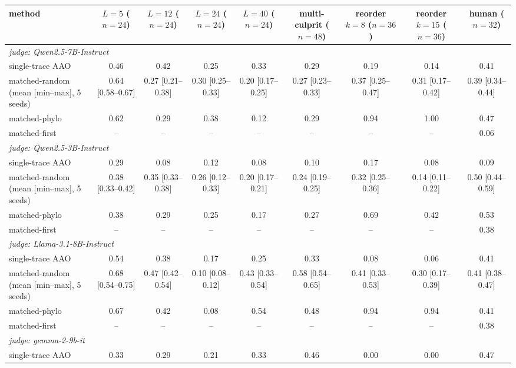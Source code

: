\begin{table}[t]
\centering\small
\begin{tabular}{lcccccccc}
\toprule
method & $L{=}5$ ($n{=}24$) & $L{=}12$ ($n{=}24$) & $L{=}24$ ($n{=}24$) & $L{=}40$ ($n{=}24$) & multi-culprit ($n{=}48$) & reorder $k{=}8$ ($n{=}36$) & reorder $k{=}15$ ($n{=}36$) & human ($n{=}32$) \\
\midrule
\multicolumn{9}{l}{\emph{judge: Qwen2.5-7B-Instruct}} \\
single-trace AAO & 0.46 & 0.42 & 0.25 & 0.33 & 0.29 & 0.19 & 0.14 & 0.41 \\
matched-random (mean [min--max], 5 seeds) & 0.64 [0.58--0.67] & 0.27 [0.21--0.38] & 0.30 [0.25--0.33] & 0.20 [0.17--0.25] & 0.27 [0.23--0.33] & 0.37 [0.25--0.47] & 0.31 [0.17--0.42] & 0.39 [0.34--0.44] \\
matched-phylo & 0.62 & 0.29 & 0.38 & 0.12 & 0.29 & 0.94 & 1.00 & 0.47 \\
matched-first & -- & -- & -- & -- & -- & -- & -- & 0.06 \\
\midrule
\multicolumn{9}{l}{\emph{judge: Qwen2.5-3B-Instruct}} \\
single-trace AAO & 0.29 & 0.08 & 0.12 & 0.08 & 0.10 & 0.17 & 0.08 & 0.09 \\
matched-random (mean [min--max], 5 seeds) & 0.38 [0.33--0.42] & 0.35 [0.33--0.38] & 0.26 [0.12--0.33] & 0.20 [0.17--0.21] & 0.24 [0.19--0.25] & 0.32 [0.25--0.36] & 0.14 [0.11--0.22] & 0.50 [0.44--0.59] \\
matched-phylo & 0.38 & 0.29 & 0.25 & 0.17 & 0.27 & 0.69 & 0.42 & 0.53 \\
matched-first & -- & -- & -- & -- & -- & -- & -- & 0.38 \\
\midrule
\multicolumn{9}{l}{\emph{judge: Llama-3.1-8B-Instruct}} \\
single-trace AAO & 0.54 & 0.38 & 0.17 & 0.25 & 0.33 & 0.08 & 0.06 & 0.41 \\
matched-random (mean [min--max], 5 seeds) & 0.68 [0.54--0.75] & 0.47 [0.42--0.54] & 0.10 [0.08--0.12] & 0.43 [0.33--0.54] & 0.58 [0.54--0.65] & 0.41 [0.33--0.53] & 0.30 [0.17--0.39] & 0.41 [0.38--0.47] \\
matched-phylo & 0.67 & 0.42 & 0.08 & 0.54 & 0.48 & 0.94 & 0.94 & 0.41 \\
matched-first & -- & -- & -- & -- & -- & -- & -- & 0.38 \\
\midrule
\multicolumn{9}{l}{\emph{judge: gemma-2-9b-it}} \\
single-trace AAO & 0.33 & 0.29 & 0.21 & 0.33 & 0.46 & 0.00 & 0.00 & 0.47 \\

\end{tabular}
\end{table}

